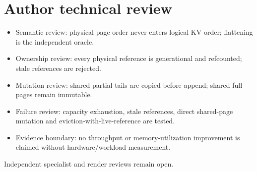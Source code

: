 \chapter*{Author technical review}
\begin{itemize}
\item Semantic review: physical page order never enters logical KV order; flattening is the independent oracle.
\item Ownership review: every physical reference is generational and refcounted; stale references are rejected.
\item Mutation review: shared partial tails are copied before append; shared full pages remain immutable.
\item Failure review: capacity exhaustion, stale references, direct shared-page mutation and eviction-with-live-reference are tested.
\item Evidence boundary: no throughput or memory-utilization improvement is claimed without hardware/workload measurement.
\end{itemize}
Independent specialist and render reviews remain open.
